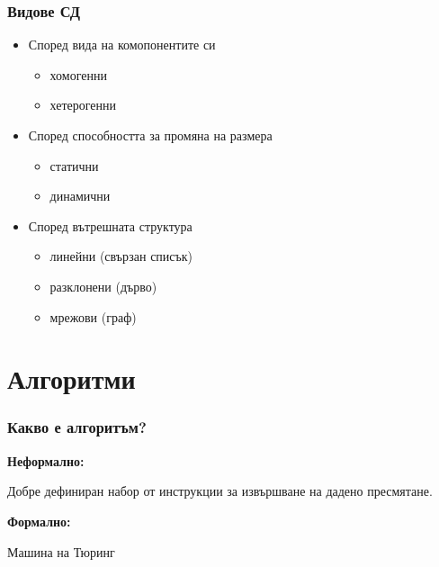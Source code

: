 \documentclass{beamer}
\begin{document}
\begin{frame}
  \frametitle{Видове СД}

  \begin{itemize}
  \item Според вида на комопонентите си
    \begin{itemize}
    \item хомогенни
    \item хетерогенни
    \end{itemize}
  \item Според способността за промяна на размера
    \begin{itemize}
    \item статични
    \item динамични
    \end{itemize}
  \item Според вътрешната структура
    \begin{itemize}
    \item линейни (свързан списък)
    \item разклонени (дърво)
    \item мрежови (граф)
    \end{itemize}
  \end{itemize}
\end{frame}

\section{Алгоритми}

\begin{frame}
  \frametitle{Какво е алгоритъм?}

  \pause

  \textbf{Неформално:}

  Добре дефиниран набор от инструкции за извършване на дадено пресмятане.
  \vspace{2cm}

  \pause

  \textbf{Формално:}

  Машина на Тюринг
\end{frame}
\end{document}
